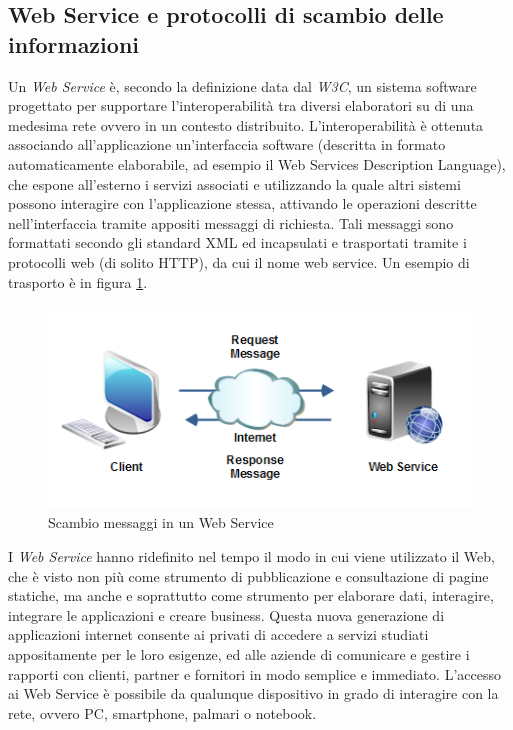 \subsection{Web Service e protocolli di scambio delle informazioni}
Un \textit{Web Service} è, secondo la definizione data dal \textit{W3C}, un sistema software progettato per supportare l'interoperabilità tra diversi elaboratori su di una medesima rete ovvero in un contesto distribuito. L'interoperabilità è ottenuta associando all'applicazione un'interfaccia software (descritta in formato automaticamente elaborabile, ad esempio il Web Services Description Language), che espone all'esterno i servizi associati e utilizzando la quale altri sistemi possono interagire con l'applicazione stessa, attivando le operazioni descritte nell'interfaccia tramite appositi messaggi di richiesta.
Tali messaggi sono formattati secondo gli standard XML ed incapsulati e trasportati tramite i protocolli web (di solito HTTP), da cui il nome web service. Un esempio di trasporto è in figura \ref{webservice}.
\begin{figure}
\begin{center}
\includegraphics[scale=1]{imgs/webservice.png} 
\caption{Scambio messaggi in un Web Service\label{webservice}}
\end{center}
\end{figure}
I \textit{Web Service} hanno ridefinito nel tempo il modo in cui viene utilizzato il Web, che è visto non più come strumento di pubblicazione e consultazione di pagine statiche, ma anche e soprattutto come strumento per elaborare dati, interagire, integrare le applicazioni e creare business.
Questa nuova generazione di applicazioni internet consente ai privati di accedere a servizi studiati appositamente per le loro esigenze, ed alle aziende di comunicare e gestire i rapporti con clienti, partner e fornitori in modo semplice e immediato.
L'accesso ai Web Service è possibile da qualunque dispositivo in grado di interagire con la rete, ovvero PC, smartphone, palmari o notebook.\\
